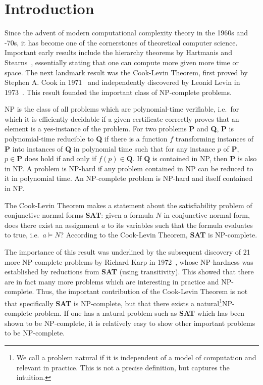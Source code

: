 \chapter{Introduction}\label{chap:introduction} 
\newcommand{\SAT}{\textbf{SAT}}
\newcommand{\Clique}{\textbf{Clique}}
\newcommand{\NP}{\textsf{NP}}
\newcommand{\PC}{\textsf{P}}

\newcommand{\PR}{\textbf{PR}}

Since the advent of modern computational complexity theory in the 1960s and -70s, it has become one of the cornerstones of theoretical computer science. 
Important early results include the hierarchy theorems by Hartmanis and Stearns~\cite{hartmanis_stearns}, essentially stating that one can compute more given more time or space. 
The next landmark result was the Cook-Levin Theorem, first proved by Stephen A. Cook in 1971~\cite{cook_theorem} and independently discovered by Leonid Levin in 1973~\cite{levin_theorem}. 
This result founded the important class of \NP{}-complete problems. 

\NP{} is the class of all problems which are polynomial-time verifiable, i.e.\ for which it is efficiently decidable if a given certificate correctly proves that an element is a yes-instance of the problem. For two problems \textbf{P} and \textbf{Q}, \textbf{P} is polynomial-time reducible to \textbf{Q} if there is a function $f$ transforming instances of \textbf{P} into instances of \textbf{Q} in polynomial time such that for any instance $p$ of \textbf{P}, $p \in \textbf{P}$ does hold if and only if $f(p) \in \textbf{Q}$. 
If $\textbf{Q}$ is contained in \NP{}, then $\textbf{P}$ is also in \NP{}.
A problem is \NP{}-hard if any problem contained in \NP{} can be reduced to it in polynomial time. An \NP{}-complete problem is \NP{}-hard and itself contained in \NP{}.  

The Cook-Levin Theorem makes a statement about the satisfiability problem of conjunctive normal forms \SAT{}: 
given a formula $N$ in conjunctive normal form, does there exist an assignment $a$ to its variables such that the formula evaluates to \textsf{true}, i.e.\ $a \models N$?
According to the Cook-Levin Theorem, \SAT{} is \NP{}-complete. 

The importance of this result was underlined by the subsequent discovery of 21 more \NP{}-complete problems by Richard Karp in 1972~\cite{Karp1972}, whose \NP{}-hardness was established by reductions from \textbf{SAT} (using transitivity). This showed that there are in fact many more problems which are interesting in practice and \NP{}-complete. 
Thus, the important contribution of the Cook-Levin Theorem is not that specifically \SAT{} is \NP{}-complete, but that there exists a natural\footnote{We call a problem natural if it is independent of a model of computation and relevant in practice. This is not a precise definition, but captures the intuition.}\NP{}-complete problem. If one has a natural problem such as \SAT{} which has been shown to be \NP{}-complete, it is relatively easy to show other important problems to be \NP{}-complete.

